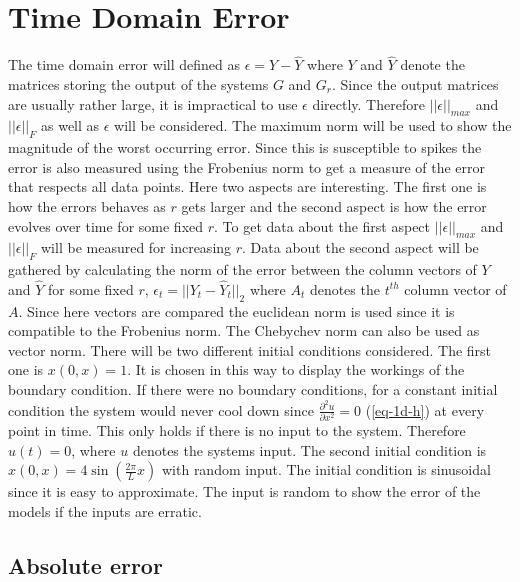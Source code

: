 \section{Time Domain Error}
The time domain error will defined as \(\epsilon = Y - \hat{Y}\) where \(Y\) and \(\hat{Y}\) denote the matrices storing the output of the systems \(G\) and \(G_r\).
Since the output matrices are usually rather large, it is impractical to use \(\epsilon\) directly.
Therefore  \(||\epsilon||_{max}\)  and \(||\epsilon||_{F}\) as well as \(\epsilon\) will be considered.
The maximum norm will be used to show the magnitude of the worst occurring error.
Since this is susceptible to spikes the error is also measured using the Frobenius norm to get a measure of the error that respects all data points.
Here two aspects are interesting.
The first one is how the errors behaves as \(r\) gets larger and the second aspect is how the error evolves over time for some fixed \(r\).
To get data about the first aspect \(||\epsilon||_{max}\)  and \(||\epsilon||_{F}\) will be measured for increasing \(r\).
Data about the second aspect will be gathered by calculating the norm of the error between the column vectors of \(Y\) and \(\hat{Y}\) for some fixed \(r\), \(\epsilon_{t} = ||Y_t - \hat{Y}_t||_{2}\) where \(A_t\) denotes the \(t^{th}\) column vector of \(A\).
Since here vectors are compared the euclidean norm is used since it is compatible to the Frobenius norm.
The Chebychev norm can also be used as vector norm.
There will be two different initial conditions considered.
The first one is \(x(0, x) = 1\).
It is chosen in this way to display the workings of the boundary condition.
If there were no boundary conditions, for a constant initial condition the system would never cool down since \(\frac{\partial^2 u}{\partial x^2} = 0\) (\ref{eq-1d-h}) at every point in time.
This only holds if there is no input to the system.
Therefore \(u(t) = 0\), where \(u\) denotes the systems input.
The second initial condition is \(x(0, x) = 4\sin(\frac{2\pi}{L}x)\) with random input.
The initial condition is sinusoidal since it is easy to approximate.
The input is random to show the error of the models if the inputs are erratic.
\subsection{Absolute error}
